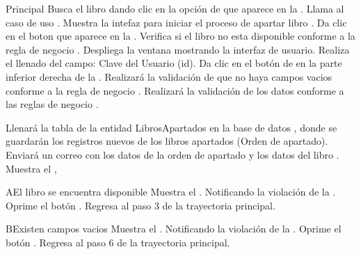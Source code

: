 	\begin{UCtrayectoria}{Principal}
		\UCpaso[\UCactor] Busca el libro dando clic en la opción de  que aparece en la .
		\UCpaso[\UCsist] Llama al caso de uso .
		\UCpaso[\UCsist] Muestra la intefaz para iniciar el proceso de apartar libro .
		\UCpaso[\UCactor] Da clic en el boton  que aparece en la .
		\UCpaso[\UCsist] Verifica si el libro no esta disponible conforme a la regla de negocio .
		\UCpaso[\UCsist] Despliega la ventana  mostrando la interfaz de usuario.
		\UCpaso[\UCactor] Realiza el llenado del campo: Clave del Usuario (id).
		\UCpaso[\UCactor] Da clic en el botón de  en la parte inferior derecha de la .
		\UCpaso[\UCsist] Realizará la validación de que no haya campos vacios conforme a la regla de negocio .		
		\UCpaso[\UCsist] Realizará la validación de los datos conforme a las reglas de negocio  .
		
		\UCpaso[\UCsist] Llenará la tabla de la entidad LibrosApartados en la base de datos , donde se guardarán los registros nuevos de los libros apartados (Orden de apartado). 
		\UCpaso[\UCsist] Enviará un correo con los datos de la orden de apartado y los datos del libro .		
		\UCpaso[\UCsist] Muestra el ,
	\end{UCtrayectoria}
		\begin{UCtrayectoriaA}{A}{El libro se encuentra disponible}
			\UCpaso[\UCsist] Muestra el . Notificando la violación de la .
			\UCpaso[\UCactor] Oprime el botón .
			\UCpaso[\UCsist] Regresa al paso 3 de la trayectoria principal.
		\end{UCtrayectoriaA}		
		
		\begin{UCtrayectoriaA}{B}{Existen campos vacios}
			\UCpaso[\UCsist] Muestra el . Notificando la violación de la .
			\UCpaso[\UCactor] Oprime el botón .
			\UCpaso[\UCsist] Regresa al paso 6 de la trayectoria principal.
		\end{UCtrayectoriaA}
		
